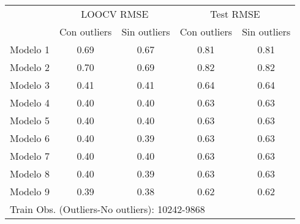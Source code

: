 \begin{table}[!h]
\centering
\begin{tabular}{lcccc}
\toprule
\multicolumn{1}{c}{} & \multicolumn{2}{c}{LOOCV RMSE} & \multicolumn{2}{c}{Test RMSE} \\
\cmidrule(l{3pt}r{3pt}){2-3} \cmidrule(l{3pt}r{3pt}){4-5}
 & Con outliers & Sin outliers & Con outliers & Sin outliers\\
\midrule
Modelo 1 & 0.69 & 0.67 & 0.81 & 0.81\\
Modelo 2 & 0.70 & 0.69 & 0.82 & 0.82\\
Modelo 3 & 0.41 & 0.41 & 0.64 & 0.64\\
Modelo 4 & 0.40 & 0.40 & 0.63 & 0.63\\
Modelo 5 & 0.40 & 0.40 & 0.63 & 0.63\\
\addlinespace
Modelo 6 & 0.40 & 0.39 & 0.63 & 0.63\\
Modelo 7 & 0.40 & 0.40 & 0.63 & 0.63\\
Modelo 8 & 0.40 & 0.39 & 0.63 & 0.63\\
Modelo 9 & 0.39 & 0.38 & 0.62 & 0.62\\
\bottomrule
\multicolumn{5}{l}{\rule{0pt}{1em}Train Obs. (Outliers-No outliers): 10242-9868}\\
\end{tabular}
\end{table}
